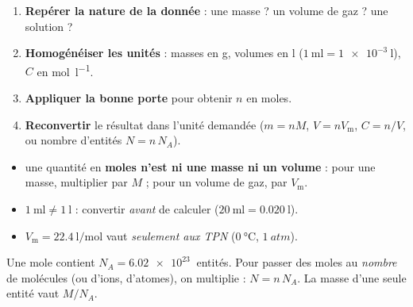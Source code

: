 \documentclass[11pt,a4paper]{article}
\begin{document}
\begin{methode}
\begin{enumerate}[leftmargin=1.7em,topsep=2pt,itemsep=1.5pt]
  \item \textbf{Repérer la nature de la donnée} : une masse ? un volume de gaz ? une solution ?
  \item \textbf{Homogénéiser les unités} : masses en \si{\gram}, volumes en \si{\litre}
        ($\qty{1}{\milli\litre}=\qty{1e-3}{\litre}$), $C$ en \si{\mole\per\litre}.
  \item \textbf{Appliquer la bonne porte} pour obtenir $n$ en moles.
  \item \textbf{Reconvertir} le résultat dans l'unité demandée ($m=nM$, $V=nV_{\mathrm{m}}$, $C=n/V$,
        ou nombre d'entités $N=n\,N_A$).
\end{enumerate}
\end{methode}

\begin{piege}
\begin{itemize}[leftmargin=1.4em,topsep=1pt,itemsep=1pt]
  \item une quantité en \textbf{moles n'est ni une masse ni un volume} : pour une masse, multiplier
        par $M$ ; pour un volume de gaz, par $V_{\mathrm{m}}$.
  \item $\qty{1}{\milli\litre}\neq\qty{1}{\litre}$ : convertir \emph{avant} de calculer
        ($\qty{20}{\milli\litre}=\qty{0.020}{\litre}$).
  \item $V_{\mathrm{m}}=\qty{22.4}{\litre\per\mole}$ vaut \emph{seulement aux TPN}
        ($\qty{0}{\celsius}$, $\qty{1}{atm}$).
\end{itemize}
\end{piege}

\begin{remarque}
Une mole contient $N_A=\qty{6.02e23}{}$ entités. Pour passer des moles au \emph{nombre} de molécules
(ou d'ions, d'atomes), on multiplie : $N=n\,N_A$. La masse d'une seule entité vaut $M/N_A$.
\end{remarque}
\end{document}
